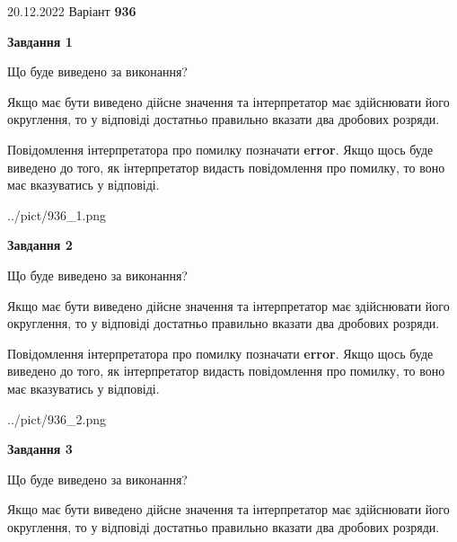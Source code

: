 \documentclass[12pt, ukrainian]{article}
\begin{document}
{20.12.2022 Варіант \No \textbf { 936 }\par}
{
\begin {Large}

{\begin {center}\textbf{Завдання 1}\end {center}}\par
Що буде виведено за виконання? \par

Якщо має бути виведено дійсне значення та інтерпретатор має здійснювати його округлення, 
то у відповіді достатньо правильно вказати два дробових розряди.

Повідомлення інтерпретатора про помилку позначати \textbf{error}.
Якщо щось буде виведено до того, як інтерпретатор видасть повідомлення про помилку, 
то воно має вказуватись у відповіді. \par

\begin{center}
	{../pict/936_1.png}
\end{center}
\newpage

{\begin {center}\textbf{Завдання 2}\end {center}}\par
Що буде виведено за виконання? \par

Якщо має бути виведено дійсне значення та інтерпретатор має здійснювати його округлення, 
то у відповіді достатньо правильно вказати два дробових розряди.

Повідомлення інтерпретатора про помилку позначати \textbf{error}.
Якщо щось буде виведено до того, як інтерпретатор видасть повідомлення про помилку, 
то воно має вказуватись у відповіді. \par

\begin{center}
	{../pict/936_2.png}
\end{center}
\newpage

{\begin {center}\textbf{Завдання 3}\end {center}}\par
Що буде виведено за виконання? \par

Якщо має бути виведено дійсне значення та інтерпретатор має здійснювати його округлення, 
то у відповіді достатньо правильно вказати два дробових розряди.


\end{Large}}
\end{document}

